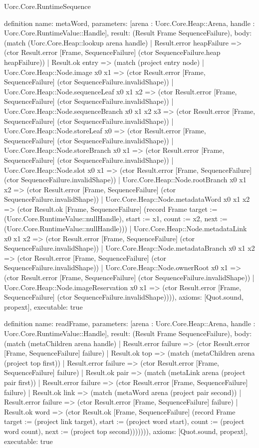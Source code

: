 \begin{lexlean}{Uorc.Core.RuntimeSequence}
\begin{semanticmodule}
definition{
  name: metaWord,
  parameters: [arena : Uorc.Core.Heap::Arena, handle : Uorc.Core.RuntimeValue::Handle],
  result: (Result Frame SequenceFailure),
  body: (match (Uorc.Core.Heap::lookup arena handle)
    | Result.error heapFailure => (ctor Result.error [Frame, SequenceFailure] (ctor SequenceFailure.heap heapFailure))
    | Result.ok entry => (match (project entry node)
      | Uorc.Core.Heap::Node.image x0 x1 => (ctor Result.error [Frame, SequenceFailure] (ctor SequenceFailure.invalidShape))
      | Uorc.Core.Heap::Node.sequenceLeaf x0 x1 x2 => (ctor Result.error [Frame, SequenceFailure] (ctor SequenceFailure.invalidShape))
      | Uorc.Core.Heap::Node.sequenceBranch x0 x1 x2 x3 => (ctor Result.error [Frame, SequenceFailure] (ctor SequenceFailure.invalidShape))
      | Uorc.Core.Heap::Node.storeLeaf x0 => (ctor Result.error [Frame, SequenceFailure] (ctor SequenceFailure.invalidShape))
      | Uorc.Core.Heap::Node.storeBranch x0 x1 => (ctor Result.error [Frame, SequenceFailure] (ctor SequenceFailure.invalidShape))
      | Uorc.Core.Heap::Node.slot x0 x1 => (ctor Result.error [Frame, SequenceFailure] (ctor SequenceFailure.invalidShape))
      | Uorc.Core.Heap::Node.rootBranch x0 x1 x2 => (ctor Result.error [Frame, SequenceFailure] (ctor SequenceFailure.invalidShape))
      | Uorc.Core.Heap::Node.metadataWord x0 x1 x2 => (ctor Result.ok [Frame, SequenceFailure] (record Frame {target := (Uorc.Core.RuntimeValue::nullHandle), start := x1, count := x2, next := (Uorc.Core.RuntimeValue::nullHandle)}))
      | Uorc.Core.Heap::Node.metadataLink x0 x1 x2 => (ctor Result.error [Frame, SequenceFailure] (ctor SequenceFailure.invalidShape))
      | Uorc.Core.Heap::Node.metadataBranch x0 x1 x2 => (ctor Result.error [Frame, SequenceFailure] (ctor SequenceFailure.invalidShape))
      | Uorc.Core.Heap::Node.ownerRoot x0 x1 => (ctor Result.error [Frame, SequenceFailure] (ctor SequenceFailure.invalidShape))
      | Uorc.Core.Heap::Node.imageReservation x0 x1 => (ctor Result.error [Frame, SequenceFailure] (ctor SequenceFailure.invalidShape)))),
  axioms: [Quot.sound, propext],
  executable: true
}

definition{
  name: readFrame,
  parameters: [arena : Uorc.Core.Heap::Arena, handle : Uorc.Core.RuntimeValue::Handle],
  result: (Result Frame SequenceFailure),
  body: (match (metaChildren arena handle)
    | Result.error failure => (ctor Result.error [Frame, SequenceFailure] failure)
    | Result.ok top => (match (metaChildren arena (project top first))
      | Result.error failure => (ctor Result.error [Frame, SequenceFailure] failure)
      | Result.ok pair => (match (metaLink arena (project pair first))
        | Result.error failure => (ctor Result.error [Frame, SequenceFailure] failure)
        | Result.ok link => (match (metaWord arena (project pair second))
          | Result.error failure => (ctor Result.error [Frame, SequenceFailure] failure)
          | Result.ok word => (ctor Result.ok [Frame, SequenceFailure] (record Frame {target := (project link target), start := (project word start), count := (project word count), next := (project top second)})))))),
  axioms: [Quot.sound, propext],
  executable: true
}


\end{semanticmodule}
\end{lexlean}
